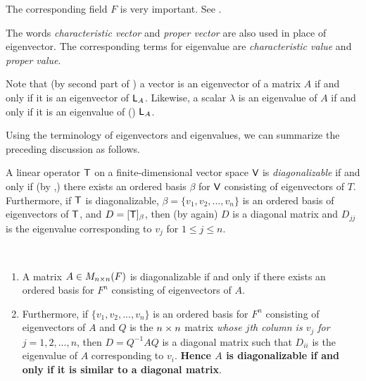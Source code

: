 \begin{remark} \label{remark 5.1.3}
The corresponding field \(F\) is very important.
See .
\end{remark}

\begin{remark} \label{remark 5.1.4}
The words \emph{characteristic vector} and \emph{proper vector} are also used in place of eigenvector.
The corresponding terms for eigenvalue are \emph{characteristic value} and \emph{proper value}.
\end{remark}

\begin{remark} \label{remark 5.1.5}
Note that (by second part of ) a vector is an eigenvector of a matrix \(A\) if and only if it is an eigenvector of \(\textsf{L}_A\).
Likewise, a scalar \(\lambda\) is an eigenvalue of \(A\) if and only if it is an eigenvalue of (\LTRAN{}) \(\textsf{L}_A\).
\end{remark}

Using the terminology of eigenvectors and eigenvalues, we can summarize the preceding discussion as follows.

\begin{theorem} \label{thm 5.1}
A linear operator \(\textsf{T}\) on a finite-dimensional vector space \(\textsf{V}\) is \emph{diagonalizable} if and only if (by ,) there exists an ordered basis \(\beta\) for \(\textsf{V}\) consisting of eigenvectors of \(T\).
Furthermore, if \(\textsf{T}\) is diagonalizable, \(\beta = \{ v_1, v_2, ..., v_n \}\) is an ordered basis of eigenvectors of \(\textsf{T}\), and \(D = [\textsf{T}]_{\beta}\), then (by  again) \(D\) is a diagonal matrix and \(D_{jj}\) is the eigenvalue corresponding to \(v_j\) for \(1 \le j \le n\).
\end{theorem}

\begin{corollary} \label{corollary 5.1.1} \ 

\begin{enumerate}
\item A matrix \(A \in M_{n \times n}(F)\) is diagonalizable if and only if there exists an ordered basis for \(F^n\) consisting of eigenvectors of \(A\).

\item
Furthermore, if \(\{ v_1, v_2, ..., v_n \}\) is an ordered basis for \(F^n\) consisting of eigenvectors of \(A\) and \(Q\) is the \(n \times n\) matrix \emph{whose \(j\)th column is \(v_j\) for \(j = 1, 2, ..., n\)}, then \(D = Q^{-1} A Q\) is a diagonal matrix such that \(D_{ii}\) is the eigenvalue of \(A\) corresponding to \(v_i\).
\textbf{Hence \(A\) is diagonalizable if and only if it is similar to a diagonal matrix}.
\end{enumerate}

\end{corollary}


